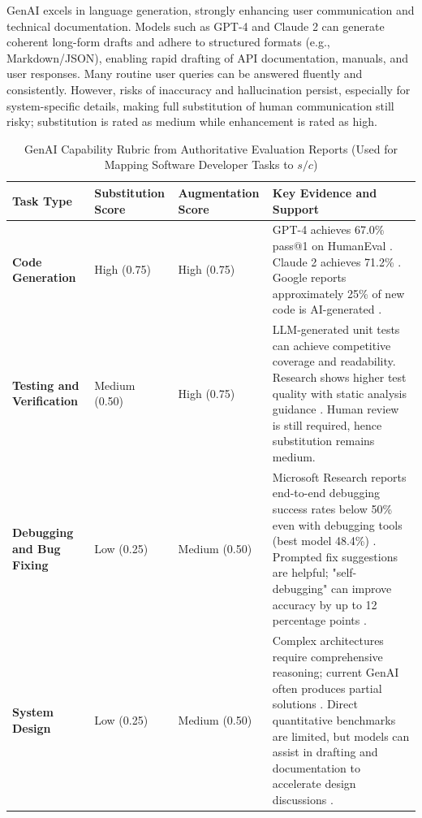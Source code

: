 GenAI excels in language generation, strongly enhancing user communication and technical documentation. Models such as GPT-4 and Claude 2 can generate coherent long-form drafts and adhere to structured formats (e.g., Markdown/JSON), enabling rapid drafting of API documentation, manuals, and user responses. Many routine user queries can be answered fluently and consistently. However, risks of inaccuracy and hallucination persist, especially for system-specific details, making full substitution of human communication still risky; substitution is rated as medium while enhancement is rated as high.\begin{table}[htbp]
\centering
\caption{GenAI Capability Rubric from Authoritative Evaluation Reports (Used for Mapping Software Developer Tasks to $s/c$)}
\label{tab:genai_capability_rubric_en}
\begin{tabular}{p{2.6cm} p{2.2cm} p{2.2cm} p{7.2cm}}
\toprule
Task Type & Substitution Score & Augmentation Score & Key Evidence and Support \\
\midrule
\textbf{Code Generation} & High (0.75) & High (0.75) &
GPT-4 achieves 67.0\% pass@1 on HumanEval \cite{openai2023gpt4}. \newline
Claude 2 achieves 71.2\% \cite{anthropic2023claude2}. \newline
Google reports approximately 25\% of new code is AI-generated \cite{techcrunch2025aimodels}. \\
\textbf{Testing and Verification} & Medium (0.50) & High (0.75) &
LLM-generated unit tests can achieve competitive coverage and readability. \newline
Research shows higher test quality with static analysis guidance \cite{arxiv2024unittest}. \newline
Human review is still required, hence substitution remains medium. \\
\textbf{Debugging and Bug Fixing} & Low (0.25) & Medium (0.50) &
Microsoft Research reports end-to-end debugging success rates below 50\% even with debugging tools (best model 48.4\%) \cite{techcrunch2025aimodels}. \newline
Prompted fix suggestions are helpful; "self-debugging" can improve accuracy by up to 12 percentage points \cite{chen2023selfdebugging}. \\
\textbf{System Design} & Low (0.25) & Medium (0.50) &
Complex architectures require comprehensive reasoning; current GenAI often produces partial solutions \cite{openai2023gpt4}. \newline
Direct quantitative benchmarks are limited, but models can assist in drafting and documentation to accelerate design discussions \cite{googleresearch2024seqmodels}. \\

\end{tabular}
\end{table}
